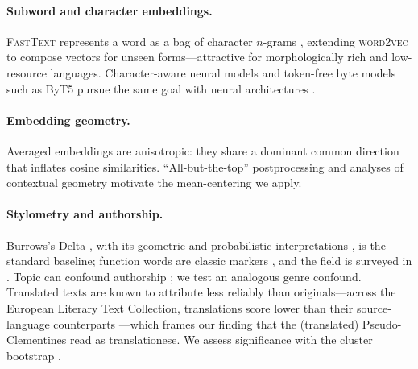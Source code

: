 \documentclass[11pt]{article}
\begin{document}
\paragraph{Subword and character embeddings.}
\textsc{FastText} represents a word as a bag of character $n$-grams
\cite{bojanowski2017enriching}, extending \textsc{word2vec}
\cite{mikolov2013distributed} to compose vectors for unseen forms---attractive
for morphologically rich and low-resource languages. Character-aware neural
models \cite{kim2016character} and token-free byte models such as ByT5
\cite{xue2022byt5} pursue the same goal with neural architectures
\cite{vaswani2017attention}.

\paragraph{Embedding geometry.}
Averaged embeddings are anisotropic: they share a dominant common direction that
inflates cosine similarities. ``All-but-the-top'' postprocessing
\cite{mu2018allbutthetop} and analyses of contextual geometry
\cite{ethayarajh2019contextual} motivate the mean-centering we apply.

\paragraph{Stylometry and authorship.}
Burrows's Delta \cite{burrows2002delta}, with its geometric and probabilistic
interpretations \cite{argamon2008interpreting,evert2017understanding}, is the
standard baseline; function words are classic markers
\cite{kestemont2014function}, and the field is surveyed in
\cite{stamatatos2009survey}. Topic can confound authorship
\cite{seroussi2014authorship}; we test an analogous genre confound. Translated
texts are known to attribute less reliably than originals---across the European
Literary Text Collection, translations score lower than their source-language
counterparts \cite{schoch2024multilingual}---which frames our finding that the
(translated) Pseudo-Clementines read as translationese. We assess significance
with the cluster bootstrap \cite{efron1986bootstrap}.
\end{document}
